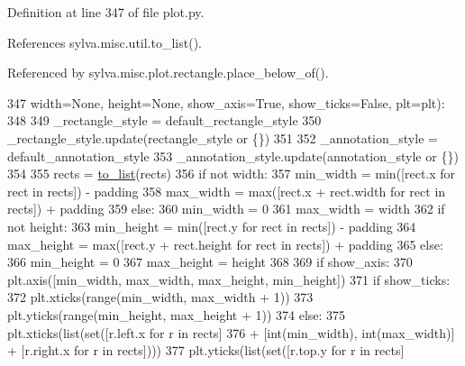Definition at line 347 of file plot.\+py.



References sylva.\+misc.\+util.\+to\+\_\+list().



Referenced by sylva.\+misc.\+plot.\+rectangle.\+place\+\_\+below\+\_\+of().


\begin{DoxyCode}
347                     width=\textcolor{keywordtype}{None}, height=\textcolor{keywordtype}{None}, show\_axis=\textcolor{keyword}{True}, show\_ticks=\textcolor{keyword}{False}, plt=plt):
348 
349         \_rectangle\_style = default\_rectangle\_style
350         \_rectangle\_style.update(rectangle\_style \textcolor{keywordflow}{or} \{\})
351 
352         \_annotation\_style = default\_annotation\_style
353         \_annotation\_style.update(annotation\_style \textcolor{keywordflow}{or} \{\})
354 
355         rects = \hyperlink{namespacesylva_1_1misc_1_1util_a03f5cfd365a10a5ec0567e320f987a9b}{to\_list}(rects)
356         \textcolor{keywordflow}{if} \textcolor{keywordflow}{not} width:
357             min\_width = min([rect.x \textcolor{keywordflow}{for} rect \textcolor{keywordflow}{in} rects]) - padding
358             max\_width = max([rect.x + rect.width \textcolor{keywordflow}{for} rect \textcolor{keywordflow}{in} rects]) + padding
359         \textcolor{keywordflow}{else}:
360             min\_width = 0
361             max\_width = width
362         \textcolor{keywordflow}{if} \textcolor{keywordflow}{not} height:
363             min\_height = min([rect.y \textcolor{keywordflow}{for} rect \textcolor{keywordflow}{in} rects]) - padding
364             max\_height = max([rect.y + rect.height \textcolor{keywordflow}{for} rect \textcolor{keywordflow}{in} rects]) + padding
365         \textcolor{keywordflow}{else}:
366             min\_height = 0
367             max\_height = height
368 
369         \textcolor{keywordflow}{if} show\_axis:
370             plt.axis([min\_width, max\_width, max\_height, min\_height])
371             \textcolor{keywordflow}{if} show\_ticks:
372                 plt.xticks(range(min\_width, max\_width + 1))
373                 plt.yticks(range(min\_height, max\_height + 1))
374             \textcolor{keywordflow}{else}:
375                 plt.xticks(list(set([r.left.x \textcolor{keywordflow}{for} r \textcolor{keywordflow}{in} rects]
376                                     + [int(min\_width), int(max\_width)] + [r.right.x \textcolor{keywordflow}{for} r \textcolor{keywordflow}{in} rects])))
377                 plt.yticks(list(set([r.top.y \textcolor{keywordflow}{for} r \textcolor{keywordflow}{in} rects]

\end{DoxyCode}
